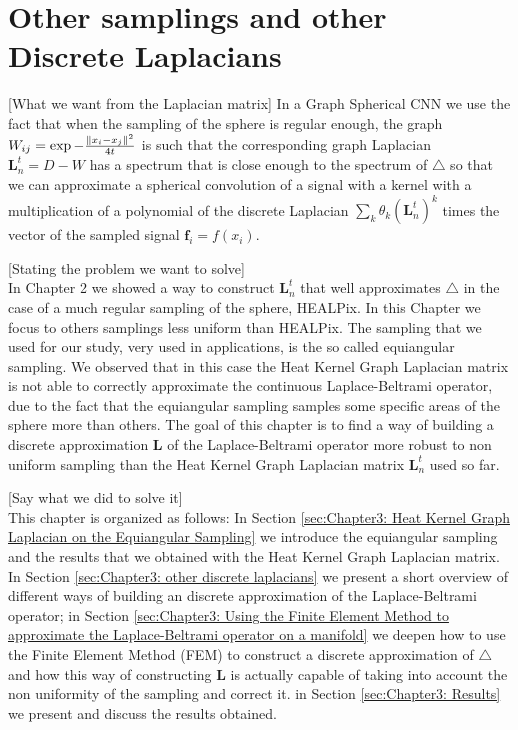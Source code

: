 

\section{Other samplings and other Discrete Laplacians}

[What we want from the Laplacian matrix] In a Graph Spherical CNN we use the fact that when the sampling of the sphere is regular enough, the graph $W_{i j} = \exp {-\frac{\left\lVert x_i-x_j\right\rVert^2}{4t}}$ is such that the corresponding graph Laplacian $\mathbf L_n^t=D-W$ has a spectrum that is close enough to the spectrum of $\triangle$ so that we can approximate a spherical convolution of a signal with a kernel with a multiplication of a polynomial of the discrete Laplacian $\sum_k \theta_k (\mathbf L_n^t)^k$ times the vector of the sampled signal $\mathbf f_i = f(x_i)$. 

[Stating the problem we want to solve]\\
In Chapter 2 we showed a way to construct $\mathbf L_n^t$ that well approximates $\triangle$ in the case of a much regular sampling of the sphere, HEALPix. In this Chapter we focus to others samplings less uniform than HEALPix. The sampling that we used for our study, very used in applications, is the so called equiangular sampling. We observed that in this case the Heat Kernel Graph Laplacian matrix is not able to correctly approximate the continuous Laplace-Beltrami operator, due to the fact that the equiangular sampling samples some specific areas of the sphere more than others. The goal of this chapter is to find a way of building a discrete approximation $\mathbf L$ of the Laplace-Beltrami operator more robust to non uniform sampling than the Heat Kernel Graph Laplacian matrix $\mathbf L_n^t$ used so far.

[Say what we did to solve it]\\
This chapter is organized as follows: In Section \ref{sec:Chapter3: Heat Kernel Graph Laplacian on the Equiangular Sampling} we introduce the equiangular sampling and the results that we obtained with the Heat Kernel Graph Laplacian matrix. In Section \ref{sec:Chapter3: other discrete laplacians} we present a short overview of different ways of building an discrete approximation of the Laplace-Beltrami operator; in Section \ref{sec:Chapter3: Using the Finite Element Method to approximate the Laplace-Beltrami operator on a manifold} we deepen how to use the Finite Element Method (FEM) to construct a discrete approximation of $\triangle$ and how this way of constructing $\mathbf L$  is actually capable of taking into account the non uniformity of the sampling and correct it. in Section \ref{sec:Chapter3: Results} we present and discuss the results obtained.
